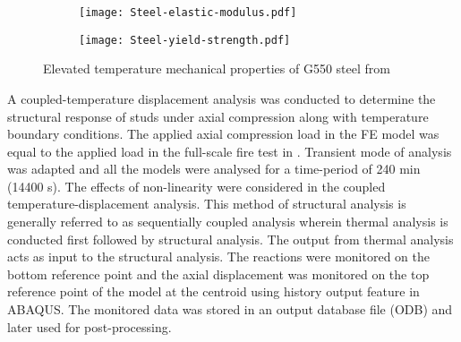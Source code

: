 \begin{figure}[!htbp]
	\centering
	\begin{subfigure}[b]{0.7\textwidth}
		\centering
		\texttt{[image: Steel-elastic-modulus.pdf]}
		\caption{}
		\label{subfig:Steel-elastic-modulus}
	\end{subfigure}
	\begin{subfigure}[b]{0.7\textwidth}
		\centering
		\texttt{[image: Steel-yield-strength.pdf]}
		\caption{}
		\label{subfig:Steel-yield strength}
	\end{subfigure}
	   \caption{Elevated temperature mechanical properties of G550 steel from \citet{Kankanamge2011}}
	   \label{fig:steel-elevated-mechanical}
\end{figure} 

A coupled-temperature displacement analysis was conducted to determine the structural response of studs under axial compression along with temperature boundary conditions. The applied axial compression load in the FE model was equal to the applied load in the full-scale fire test in . Transient mode of analysis was adapted and all the models were analysed for a time-period of 240 min (14400 s). The effects of non-linearity were considered in the coupled temperature-displacement analysis. This method of structural analysis is generally referred to as sequentially coupled analysis wherein thermal analysis is conducted first followed by structural analysis. The output from thermal analysis acts as input to the structural analysis. The reactions were monitored on the bottom reference point and the axial displacement was monitored on the top reference point of the model at the centroid using history output feature in ABAQUS. The monitored data was stored in an output database file (ODB) and later used for post-processing. 


